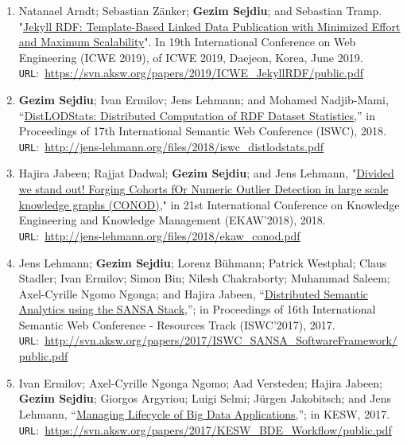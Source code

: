 \begin{itemize}
\begin{enumerate}
    \item Natanael Arndt; Sebastian Zänker; \textbf{Gezim Sejdiu}; and Sebastian Tramp. "\href{https://svn.aksw.org/papers/2019/ICWE_JekyllRDF/public.pdf}{Jekyll RDF: Template-Based Linked Data Publication with Minimized Effort and Maximum Scalability}". In 19th International Conference on Web Engineering (ICWE 2019), of ICWE 2019, Daejeon, Korea, June 2019. \texttt{URL}:~\url{https://svn.aksw.org/papers/2019/ICWE_JekyllRDF/public.pdf}

    \item \textbf{Gezim Sejdiu}; Ivan Ermilov; Jens Lehmann; and Mohamed Nadjib-Mami, “\href{http://jens-lehmann.org/files/2018/iswc_distlodstats.pdf}{DistLODStats: Distributed Computation of RDF Dataset Statistics},” in Proceedings of 17th International Semantic Web Conference (ISWC), 2018. \texttt{URL}:~\url{http://jens-lehmann.org/files/2018/iswc_distlodstats.pdf}

    \item Hajira Jabeen; Rajjat Dadwal; \textbf{Gezim Sejdiu}; and Jens Lehmann, "\href{http://jens-lehmann.org/files/2018/ekaw_conod.pdf}{Divided we stand out! Forging Cohorts fOr Numeric Outlier Detection in large scale knowledge graphs (CONOD)}," in 21st International Conference on Knowledge Engineering and Knowledge Management (EKAW'2018), 2018. \texttt{URL}:~\url{http://jens-lehmann.org/files/2018/ekaw_conod.pdf}

    \item Jens Lehmann; \textbf{Gezim Sejdiu}; Lorenz Bühmann; Patrick Westphal; Claus Stadler; Ivan Ermilov; Simon Bin; Nilesh Chakraborty; Muhammad Saleem; Axel-Cyrille Ngomo Ngonga; and Hajira Jabeen, “\href{http://svn.aksw.org/papers/2017/ISWC_SANSA_SoftwareFramework/public.pdf}{Distributed Semantic Analytics using the SANSA Stack},”; in Proceedings of 16th International Semantic Web Conference - Resources Track (ISWC’2017), 2017. \texttt{URL}:~\url{http://svn.aksw.org/papers/2017/ISWC_SANSA_SoftwareFramework/public.pdf}

    \item Ivan Ermilov; Axel-Cyrille Ngonga Ngomo; Aad Versteden; Hajira Jabeen; \textbf{Gezim Sejdiu}; Giorgos Argyriou; Luigi Selmi; Jürgen Jakobitsch; and Jens Lehmann, “\href{https://svn.aksw.org/papers/2017/KESW_BDE_Workflow/public.pdf}{Managing Lifecycle of Big Data Applications},”; in KESW, 2017. \texttt{URL}:~\url{https://svn.aksw.org/papers/2017/KESW_BDE_Workflow/public.pdf}


\end{enumerate}
\end{itemize}
